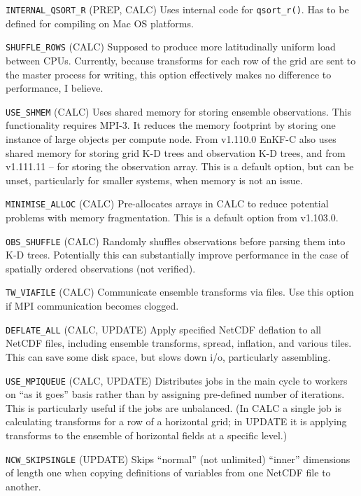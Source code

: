 \documentclass[11pt]{report}
\begin{document}
\begin{description}
\item{\verb|INTERNAL_QSORT_R|} (PREP, CALC)
  Uses internal code for \verb|qsort_r()|.
  Has to be defined for compiling on Mac OS platforms.
\item{\verb|SHUFFLE_ROWS|} (CALC)
  Supposed to produce more latitudinally uniform load between CPUs.
  Currently, because transforms for each row of the grid are sent to the master process for writing, this option effectively makes no difference to performance, I believe.
\item{\verb|USE_SHMEM|} (CALC)
  Uses shared memory for storing ensemble observations.
  This functionality requires MPI-3.
  It reduces the memory footprint by storing one instance of large objects per compute node.
  From v1.110.0 EnKF-C also uses shared memory for storing grid K-D trees and observation K-D trees, and from v1.111.11 -- for storing the observation array.
  This is a default option, but can be unset, particularly for smaller systems, when memory is not an issue.
\item{\verb|MINIMISE_ALLOC|} (CALC)
  Pre-allocates arrays in CALC to reduce potential problems with memory fragmentation.
  This is a default option from v1.103.0.
\item{\verb|OBS_SHUFFLE|} (CALC)
  Randomly shuffles observations before parsing them into K-D trees.
  Potentially this can substantially improve performance in the case of spatially ordered observations (not verified).
\item{\verb|TW_VIAFILE|} (CALC)
  Communicate ensemble transforms via files.
  Use this option if MPI communication becomes clogged.
\item{\verb|DEFLATE_ALL|} (CALC, UPDATE)
  Apply specified NetCDF deflation to all NetCDF files, including ensemble transforms, spread, inflation, and various tiles.
  This can save some disk space, but slows down i/o, particularly assembling.
\item{\verb|USE_MPIQUEUE|} (CALC, UPDATE)
  Distributes jobs in the main cycle to workers on ``as it goes'' basis rather than by assigning pre-defined number of iterations.
  This is particularly useful if the jobs are unbalanced.
  (In CALC a single job is calculating transforms for a row of a horizontal grid; in UPDATE it is applying transforms to the ensemble of horizontal fields at a specific level.)
\item{\verb|NCW_SKIPSINGLE|} (UPDATE)
  Skips ``normal'' (not unlimited) ``inner'' dimensions of length one when copying definitions of variables from one NetCDF file to another.
\end{description}
\end{document}
